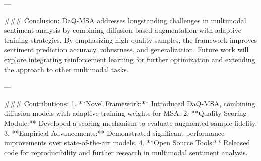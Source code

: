 ---

### Conclusion:
DaQ-MSA addresses longstanding challenges in multimodal sentiment analysis by combining diffusion-based augmentation with adaptive training strategies. By emphasizing high-quality samples, the framework improves sentiment prediction accuracy, robustness, and generalization. Future work will explore integrating reinforcement learning for further optimization and extending the approach to other multimodal tasks.

---

### Contributions:
1. **Novel Framework:** Introduced DaQ-MSA, combining diffusion models with adaptive training weights for MSA.
2. **Quality Scoring Module:** Developed a scoring mechanism to evaluate augmented sample fidelity.
3. **Empirical Advancements:** Demonstrated significant performance improvements over state-of-the-art models.
4. **Open Source Tools:** Released code for reproducibility and further research in multimodal sentiment analysis.

